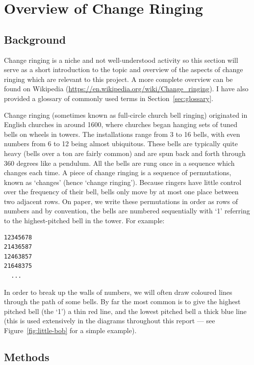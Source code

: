 \documentclass[12pt]{article}
\begin{document}
\pagebreak

\section{Overview of Change Ringing}

\subsection{Background}

Change ringing is a niche and not well-understood activity so this section will serve as a short
introduction to the topic and overview of the aspects of change ringing which are relevant to this
project.  A more complete overview can be found on
Wikipedia (\url{https://en.wikipedia.org/wiki/Change_ringing}).  I have also provided a glossary of
commonly used terms in Section~\ref{sec:glossary}.

Change ringing (sometimes known as full-circle church bell ringing) originated in English
churches in around 1600, where churches began hanging sets of tuned bells on wheels in towers.
The installations range from 3 to 16 bells, with even numbers from 6 to 12 being almost ubiquitous.
These bells are typically quite heavy (bells over a ton are fairly common) and are spun
back and forth through 360 degrees like a pendulum.  All the bells are rung once in a sequence which
changes each time.  A piece of change ringing is a sequence of permutations, known as `changes'
(hence `change ringing').  Because ringers have little control over the frequency of their bell,
bells only move by at most one place between two adjacent rows.  On paper, we write these
permutations in order as rows of numbers and by convention, the bells are numbered sequentially with
`1' referring to the highest-pitched bell in the tower.  For example:

\begin{verbatim}
12345678
21436587
12463857
21648375
  ...
\end{verbatim}

In order to break up the walls of numbers, we will often draw coloured lines through the path of
some bells.  By far the most common is to give the highest pitched bell (the `1') a thin red line,
and the lowest pitched bell a thick blue line (this is used extensively in the diagrams throughout
this report --- see Figure~\ref{fig:little-bob} for a simple example).  

\subsection{Methods}
\end{document}
